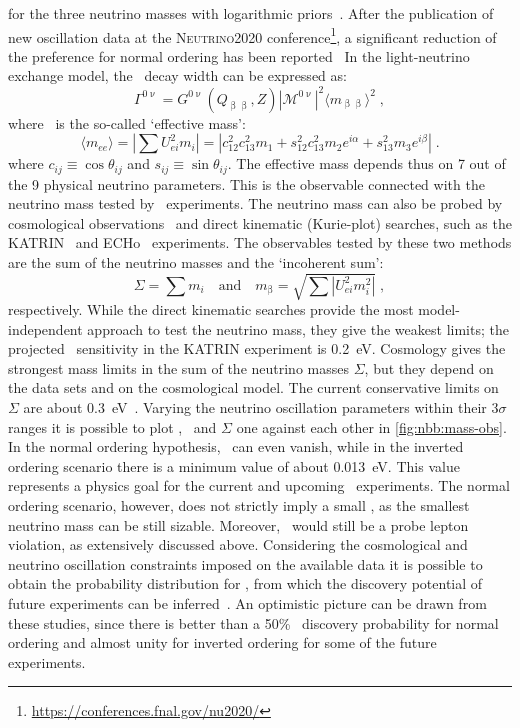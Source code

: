 for the three neutrino masses with logarithmic priors~\cite{Gariazzo2018}. After the
publication of new oscillation data at the \textsc{Neutrino2020}
conference\footnote{\url{https://conferences.fnal.gov/nu2020/}}, a significant reduction
of the preference for normal ordering has been reported~\cite{Kelly2020, Esteban2020}
\newpar
In the light-neutrino exchange model, the \onbb\ decay width can be expressed as:
\begin{equation}\label{eq:nbb:0nudecayrate}
  \Gamma^{0\upnu} = G^{0\upnu}(Q_{\upbeta\upbeta}, Z)
                  |\mathcal{M}^{0\upnu}|^2
                  \langle{m_{\upbeta\upbeta}}\rangle^2 \;,
\end{equation}
where \mbb\ is the so-called `effective mass':
\[
  \langle m_{ee} \rangle = \left| \sum U_{ei}^2 m_i \right|
                         = |c^2_{12} c^2_{13} m_1
                            + s^2_{12} c^2_{13} m_2 e^{i\alpha}
                            + s^2_{13} m_3 e^{i\beta}| \;.
\]
where $c_{ij} \equiv \cos{\theta_{ij}}$ and $s_{ij} \equiv \sin{\theta_{ij}}$.  The
effective mass depends thus on 7 out of the 9 physical neutrino parameters.  This is the
observable connected with the neutrino mass tested by \onbb\ experiments.  The neutrino
mass can also be probed by cosmological observations~\cite{Gerbino2018} and direct
kinematic (Kurie-plot) searches, such as the KATRIN~\cite{Aker2019} and
ECHo~\cite{Gastaldo2018} experiments.  The observables tested by these two methods are the
sum of the neutrino masses and the `incoherent sum':
\[
  \Sigma = \sum m_i \quad \text{and} \quad m_{\upbeta}
         = \sqrt{\sum |U_{ei}^2 m_i^2|} \;,
\]
respectively. While the direct kinematic searches provide the most model-independent
approach to test the neutrino mass, they give the weakest limits; the projected \mb\
sensitivity in the KATRIN experiment is 0.2~eV.  Cosmology gives the strongest mass limits
in the sum of the neutrino masses $\Sigma$, but they depend on the data sets and on the
cosmological model. The current conservative limits on $\Sigma$ are about
0.3~eV~\cite{Aghanim2018}.
\newpar
Varying the neutrino oscillation parameters within their $3\sigma$ ranges it is possible
to plot \mbb, \mb\ and $\Sigma$ one against each other in \cref{fig:nbb:mass-obs}. In the
normal ordering hypothesis, \mbb\ can even vanish, while in the inverted ordering scenario
there is a minimum value of about 0.013~eV. This value represents a physics goal for the
current and upcoming \onbb\ experiments. The normal ordering scenario, however, does not
strictly imply a small \mbb, as the smallest neutrino mass can be still sizable. Moreover,
\onbb\ would still be a probe lepton violation, as extensively discussed above.
\newpar
Considering the cosmological and neutrino oscillation constraints imposed on the available
data it is possible to obtain the probability distribution for \mbb, from which the
discovery potential of future experiments can be inferred~\cite{Caldwell2017,
Agostini2017a, Ge2017}. An optimistic picture can be drawn from these studies, since there
is better than a 50\% \onbb\ discovery probability for normal ordering and almost unity
for inverted ordering for some of the future experiments.

